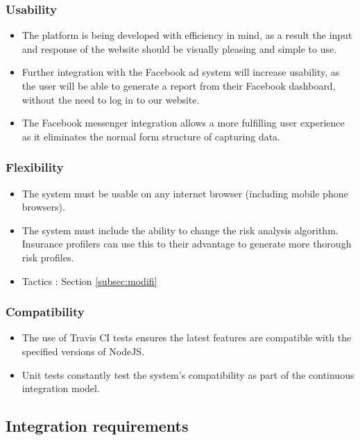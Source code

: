 \documentclass{article}
\begin{document}
		\subsubsection{Usability}
		\begin{itemize}
			\item The platform is being developed with efficiency in mind, as a result the input and response of the website should be visually pleasing and simple to use.
			\item Further integration with the Facebook ad system will increase usability, as the user will be able to generate a report from their Facebook dashboard, without the need to log in to our website.
			\item The Facebook messenger integration allows a more fulfilling user experience as it eliminates the normal form structure of capturing data.
		\end{itemize}

		\subsubsection{Flexibility}
		\begin{itemize}
			\item The system must be usable on any internet browser (including mobile phone browsers).
			\item The system must include the ability to change the risk analysis algorithm. Insurance profilers can use this to their advantage to generate more thorough risk profiles.
			\item Tactics : Section \ref{subsec:modifi}
		\end{itemize}

		\subsubsection{Compatibility}
		\begin{itemize}
			\item The use of Travis CI tests ensures the latest features are compatible with the specified versions of NodeJS.
			\item Unit tests constantly test the system's compatibility as part of the continuous integration model.
		\end{itemize}
		


	\subsection{Integration requirements}
\end{document}

